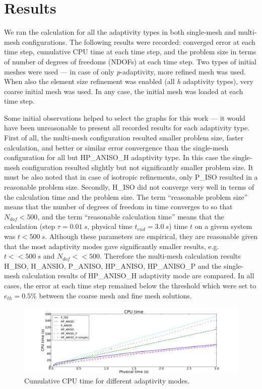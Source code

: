 \section{Results}

We ran the calculation for all the adaptivity types 
in both single-mesh and multi-mesh configurations. The following results
were recorded: converged error at each time step, cumulative CPU
time at each time step, and the problem size in terms of number
of degrees of freedoms (NDOFs) at each time step.  
Two types of initial meshes were used --- in case of only \emph{p}-adaptivity,
more refined mesh was used. When also the element size refinement
was enabled (all \emph{h} adaptivity types), very coarse initial mesh
was used. In any case, the initial mesh was loaded at each time step.

Some initial observations
helped to select the graphs for this work --- it would have been unreasonable 
to present all recorded results for each adaptivity type.
First of all, the multi-mesh configuration resulted smaller problem size, faster
calculation, and better or similar error convergence than the single-mesh
configuration for all but HP\_ANISO\_H adaptivity type. In this case
the single-mesh configuration resulted slightly but not significantly
smaller problem size. It must be also noted that in case of isotropic
refinements, only P\_ISO resulted in a reasonable problem size.
Secondly, H\_ISO did not converge very well in terms of the
calculation time and the problem size. The term ``reasonable problem size''
means that the number of degrees of freedom in time converges
to so that $N_{dof}<500$, and the term ``reasonable calculation time''
means that the calculation (step $\tau=0.01\ s$, physical
time $t_{end}=3.0\ s$) time $t$ on a givem system was $t<500\ s$.
Although these parameters are empirical, they are reasonable given
that the most adaptivity modes gave significantly smaller results,
e.g. $t<<500\ s$ and $N_{dof} << 500$.
Therefore the multi-mesh calculation results H\_ISO, H\_ANSIO, P\_ANISO,
HP\_ANISO, HP\_ANISO\_P and the single-mesh calculation results of HP\_ANISO\_H
adaptivity mode are compared. In all cases, the error at each time step remained below
the threshold which were set to $e_{th}=0.5\%$ between the coarse mesh
and fine mesh solutions.

\begin{figure}
  \begin{centering}
  \includegraphics[width=\columnwidth]{cpu}
  \caption{\label{fig:cpu} Cumulative CPU time for different adaptivity modes.}
  \end{centering}
\end{figure}

